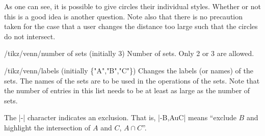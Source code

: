 \documentclass[a4paper]{ltxdoc}
\begin{document}
\begin{codeexample}[width=5cm]
\end{codeexample}

As one can see, it is possible to give circles their individual styles. Whether
or not this is a good idea is another question. Note also that there is no precaution taken for the case that a user changes the
distance too large such that the circles do not intersect.


\begin{key}{/tikz/venn/number of sets (initially 3)}
        Number of sets. Only 2 or 3 are allowed.
\end{key}


\begin{codeexample}[width=5cm]
\end{codeexample}


\begin{key}{/tikz/venn/labels (initially \{"A","B","C"\})}
		Changes the labels (or names) of the sets. The names of the sets are to
		be used in the operations of the sets. Note that the number of entries
		in this list needs to be at least as large as the number of sets.
\end{key}

\begin{codeexample}[width=5cm]
\end{codeexample}

The |-| character indicates an exclusion. That is, |-B,AuC| means ``exclude $B$
and highlight the intersection of $A$ and $C$, $A\cap C$''.

\begin{codeexample}[width=5cm]
\end{codeexample}
\end{document}

